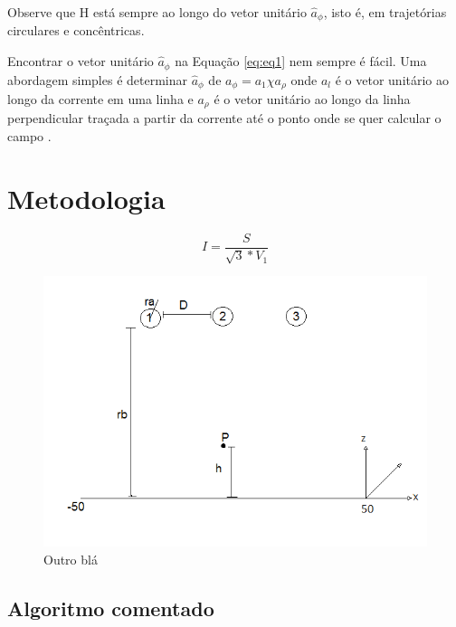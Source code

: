 \documentclass[12pt,a4paper]{article}
\begin{document}
Observe que H está sempre ao longo do vetor unitário $\hat{a}_{\phi}$, isto é, em trajetórias circulares
e concêntricas.

Encontrar o vetor unitário $\hat{a}_\phi$ na Equação \ref{eq:eq1} nem sempre é fácil. Uma abordagem simples
é determinar $\hat{a}_{\phi}$ de $a_{\phi} = a_1 \chi a_{\rho}$ onde $a_l$ é o vetor unitário ao longo da corrente em uma linha e $a_\rho$ é o vetor unitário ao longo da linha perpendicular traçada a partir da corrente até o ponto onde se quer calcular o campo .

\newpage
\section{Metodologia}

\lipsum[1-3]

\begin{equation}
I = \frac{S}{\sqrt{3} \ast V_1}
\label{eq:eq2}
\end{equation}

\lipsum[1-1]

\begin{figure}[!h]
\centering \includegraphics[scale=0.5]{figuras/figura2.png}
\caption{Outro blá} \label{fig:fig2}
\end{figure}

\lipsum[1-1]


\subsection{Algoritmo comentado}
\end{document}
